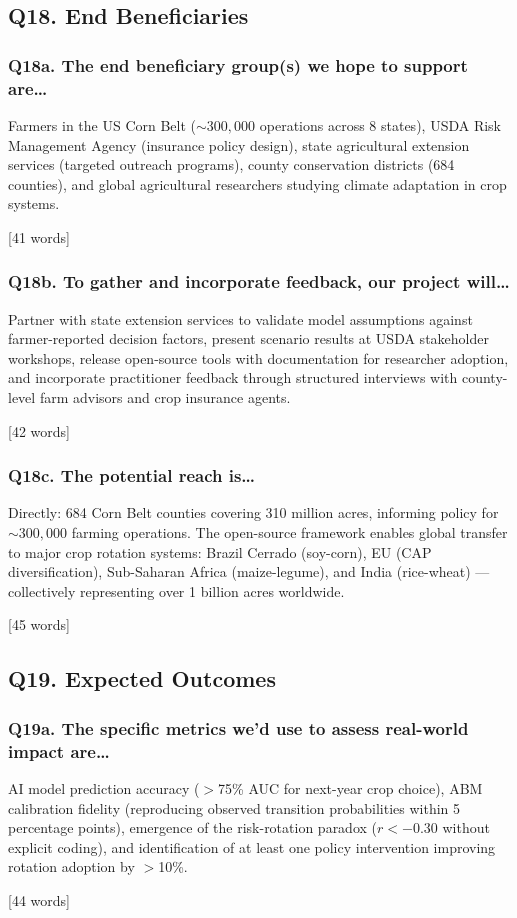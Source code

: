 \documentclass[11pt,letterpaper]{article}
\newcommand{\answer}[1]{%
    \vspace{0.2em}%
    \noindent\colorbox{answerbox}{\parbox{\dimexpr\textwidth-2\fboxsep}{%
        \vspace{0.4em}#1\vspace{0.4em}%
    }}%
    \vspace{0.5em}%
}
\newcommand{\wordcount}[1]{%
    \hfill{\scriptsize\textcolor{notegray}{[#1 words]}}%
}
\begin{document}
\subsection{Q18. End Beneficiaries}

\subsubsection{Q18a. The end beneficiary group(s) we hope to support are\ldots}
\answer{Farmers in the US Corn Belt (${\sim}300{,}000$ operations across 8 states), USDA Risk Management Agency (insurance policy design), state agricultural extension services (targeted outreach programs), county conservation districts (684 counties), and global agricultural researchers studying climate adaptation in crop systems.}
\wordcount{41}

\subsubsection{Q18b. To gather and incorporate feedback, our project will\ldots}
\answer{Partner with state extension services to validate model assumptions against farmer-reported decision factors, present scenario results at USDA stakeholder workshops, release open-source tools with documentation for researcher adoption, and incorporate practitioner feedback through structured interviews with county-level farm advisors and crop insurance agents.}
\wordcount{42}

\subsubsection{Q18c. The potential reach is\ldots}
\answer{Directly: 684 Corn Belt counties covering 310 million acres, informing policy for ${\sim}300{,}000$ farming operations. The open-source framework enables global transfer to major crop rotation systems: Brazil Cerrado (soy-corn), EU (CAP diversification), Sub-Saharan Africa (maize-legume), and India (rice-wheat) --- collectively representing over 1 billion acres worldwide.}
\wordcount{45}

\subsection{Q19. Expected Outcomes}

\subsubsection{Q19a. The specific metrics we'd use to assess real-world impact are\ldots}
\answer{AI model prediction accuracy ({$>$}75\% AUC for next-year crop choice), ABM calibration fidelity (reproducing observed transition probabilities within 5 percentage points), emergence of the risk-rotation paradox ($r < -0.30$ without explicit coding), and identification of at least one policy intervention improving rotation adoption by {$>$}10\%.}
\wordcount{44}
\end{document}
